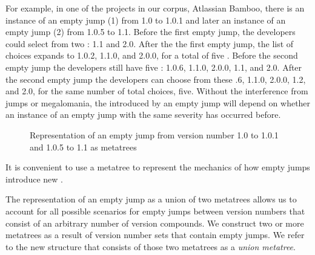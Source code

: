 \documentclass[conference]{IEEEtran}
\begin{document}
For example, in one of the projects in our corpus, Atlassian Bamboo, there is an instance of an empty jump (1) from 1.0 to 1.0.1 and later an instance of an empty jump (2) from 1.0.5 to 1.1.
Before the first empty jump, the developers could select from two \choices: 1.1 and 2.0.
After the the first empty jump, the list of choices expands to 1.0.2, 1.1.0, and 2.0.0, for a total of five \choices.
Before the second empty jump the developers still have five \choices: 1.0.6, 1.1.0, 2.0.0, 1.1, and 2.0. 
After the second empty jump the developers can choose from these .6, 1.1.0, 2.0.0, 1.2, and 2.0, for the same number of total choices, five.
Without the interference from jumps or megalomania, the \numberchoices introduced by an empty jump will depend on whether an instance of an empty jump with the same severity has occurred before.


%
%
%


\begin{figure}
\begin{center}
 \begin{adjustbox}{width=.5\textwidth}

\end{adjustbox}
\end{center}
\caption{Representation of an empty jump from version number 1.0 to 1.0.1 and 1.0.5 to 1.1 as metatrees}
\label{fig:emptyJumpMeta}
\end{figure}

It is convenient to use a metatree to represent the mechanics of how empty jumps introduce new \choices.

The representation of an empty jump as a union of two metatrees allows us to account for all possible scenarios for empty jumps between version numbers that consist of an arbitrary number of version compounds.%
We construct two or more metatrees as a result of version number sets that contain empty jumps. 
We refer to the new structure that consists of those two metatrees as a \emph{union metatree}.%
\end{document}
